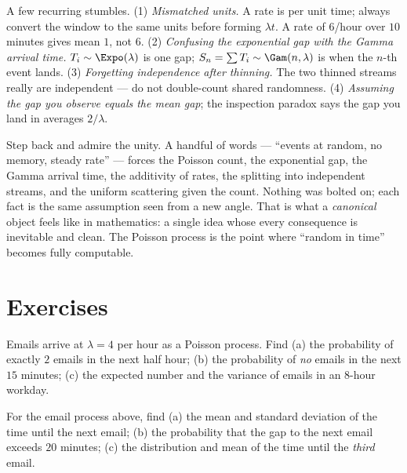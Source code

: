 \begin{trapbox}
A few recurring stumbles. (1) \emph{Mismatched units.} A rate is per unit time;
always convert the window to the same units before forming $\lambda t$. A rate of
$6$/hour over $10$ minutes gives mean $1$, not $6$. (2) \emph{Confusing the
exponential gap with the Gamma arrival time.} $T_i\sim\Expo(\lambda)$ is one gap;
$S_n=\sum T_i \sim\Gam(n,\lambda)$ is when the $n$-th event lands. (3)
\emph{Forgetting independence after thinning.} The two thinned streams really are
independent --- do not double-count shared randomness. (4) \emph{Assuming the gap
you observe equals the mean gap}; the inspection paradox says the gap you land in
averages $2/\lambda$.
\end{trapbox}

\begin{aestheticbox}
Step back and admire the unity. A handful of words --- ``events at random, no
memory, steady rate'' --- forces the Poisson count, the exponential gap, the
Gamma arrival time, the additivity of rates, the splitting into independent
streams, and the uniform scattering given the count. Nothing was bolted on; each
fact is the same assumption seen from a new angle. That is what a \emph{canonical}
object feels like in mathematics: a single idea whose every consequence is
inevitable and clean. The Poisson process is the point where ``random in time''
becomes fully computable.
\end{aestheticbox}

\section{Exercises}
\label{ch25:exercises}

\begin{exercise}
\label{ch25:exr-counts}
Emails arrive at $\lambda = 4$ per hour as a Poisson process. Find (a) the
probability of exactly $2$ emails in the next half hour; (b) the probability of
\emph{no} emails in the next $15$ minutes; (c) the expected number and the
variance of emails in an $8$-hour workday.
\end{exercise}

\begin{exercise}
\label{ch25:exr-gaps}
For the email process above, find (a) the mean and standard deviation of the time
until the next email; (b) the probability that the gap to the next email exceeds
$20$ minutes; (c) the distribution and mean of the time until the \emph{third}
email.
\end{exercise}

